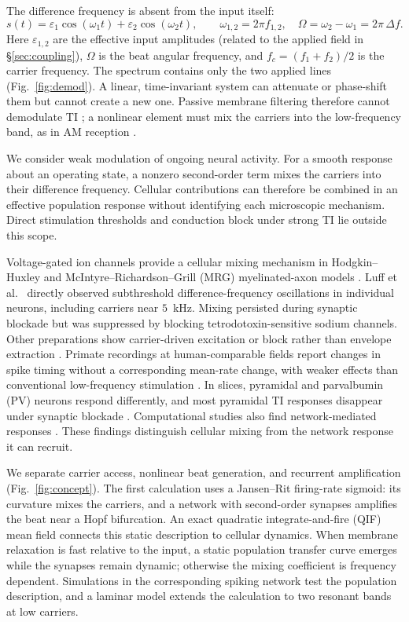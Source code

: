 \documentclass[11pt,a4paper]{article}
\begin{document}
The difference frequency is absent from the input itself:
\begin{equation}
s(t)=\varepsilon_1\cos(\omega_1 t)+\varepsilon_2\cos(\omega_2 t),\qquad
\omega_{1,2}=2\pi f_{1,2},\quad \Omega=\omega_2-\omega_1=2\pi\,\Delta f .
\label{eq:am}
\end{equation}
Here $\varepsilon_{1,2}$ are the effective input amplitudes (related to the applied field
in \S\ref{sec:coupling}), $\Omega$ is the beat angular frequency, and
$f_c=(f_1+f_2)/2$ is the carrier frequency. The spectrum contains only the two applied
lines (Fig.~\ref{fig:demod}). A linear, time-invariant system can attenuate or phase-shift
them but cannot create a new one. Passive membrane filtering therefore cannot
demodulate TI \cite{mirzakhalili2020}; a nonlinear element must mix the carriers into
the low-frequency band, as in AM reception \cite{nahin2001}.

We consider weak modulation of ongoing neural activity. For a smooth response
about an operating state, a nonzero second-order term mixes the carriers into
their difference frequency. Cellular contributions can therefore be combined in
an effective population response without identifying each microscopic mechanism.
Direct stimulation thresholds and conduction block under strong TI lie outside
this scope.

Voltage-gated ion channels provide a cellular mixing mechanism in Hodgkin--Huxley
and McIntyre--Richardson--Grill (MRG) myelinated-axon models \cite{mirzakhalili2020}.
Luff et al.\ \cite{luff2024mixer} directly observed subthreshold difference-frequency
oscillations in individual neurons, including carriers near $5$~kHz. Mixing persisted
during synaptic blockade but was suppressed by blocking tetrodotoxin-sensitive sodium
channels. Other preparations show carrier-driven excitation or block rather than
envelope extraction \cite{opancar2025,peripheral2023,semenov2025}. Primate recordings at
human-comparable fields report changes in spike timing without a corresponding
mean-rate change, with weaker effects than conventional low-frequency stimulation
\cite{vieira2024}. In slices, pyramidal and parvalbumin (PV) neurons respond differently,
and most pyramidal TI responses disappear under synaptic blockade \cite{caldas2024}.
Computational studies also find network-mediated responses
\cite{karimi2024,soroushi2025,wangw2026}. These findings distinguish cellular mixing from
the network response it can recruit.

We separate carrier access, nonlinear beat generation, and recurrent amplification
(Fig.~\ref{fig:concept}). The first calculation uses a Jansen--Rit firing-rate sigmoid:
its curvature mixes the carriers, and a network with second-order synapses amplifies
the beat near a Hopf bifurcation. An exact quadratic integrate-and-fire (QIF) mean
field connects this static description to cellular dynamics. When membrane relaxation
is fast relative to the input, a static population transfer curve emerges while the
synapses remain dynamic; otherwise the mixing coefficient is frequency dependent.
Simulations in the corresponding spiking network test the population description,
and a laminar model extends the calculation to two resonant bands at low carriers.
\end{document}
